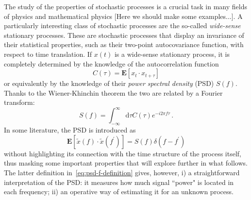 \documentclass[twocolumn,showpacs,preprintnumbers,nofootinbib,prd,
superscriptaddress,10pt]{revtex4-1}
\begin{document}
The study of the properties of  stochastic processes is a crucial task in many fields of physics and mathematical physics [Here we should make some examples...].
A particularly interesting class of stochastic processes are the so-called \textit{wide-sense} stationary processes. These are stochastic processes that display an invariance of their statistical properties, such as their two-point autocovariance function, with respect to time translation. If $x(t)$ is a wide-sense stationary process, it is completely determined by the knowledge of the autocorrelation function 
\begin{equation}
	C(\tau) = \mathbf{E}[x_t \cdot x_{t+\tau}]
\end{equation}
or equivalently by the knowledge of their \emph{power spectral density} (PSD) $S(f)$. Thanks to the Wiener-Khinchin theorem the two are related by a Fourier transform: 
\begin{equation}\label{eq:psd-autocorrelation}
	S(f) = \int_{-\infty}^{\infty} \textrm{d}\tau C(\tau) e^{-i 2 \pi f \tau}\,.
\end{equation}
In some literature, the PSD is introduced as  
\begin{equation}\label{eq:psd-f-definition}
	\mathbf{E}[\tilde{x}(f) \cdot \tilde{x}(f^\prime)] = S(f) \delta(f-f^\prime)
\end{equation}
without highlighting its connection with the time structure of the process itself, thus masking some important properties that will explore further in what follows. The latter definition in~\eqref{eq:psd-f-definition} gives, however, i) a straightforward interpretation of the PSD: it measures how much signal ``power" is located in each frequency; ii) an operative way of estimating it for an unknown process.  
\end{document}
